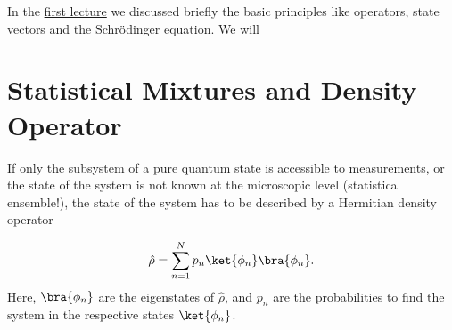 In the \href{https://www.authorea.com/326007/wyOpqBcLPiiNhswBbwDHbA}{first lecture} we discussed briefly the basic principles like operators, state vectors and the Schrödinger equation. We will 

\section{Statistical Mixtures and Density Operator}

If only the subsystem of a pure quantum state is accessible to measurements, or the state of the system is not known at the microscopic level (statistical ensemble!), the state of the system has to be described by a Hermitian density operator

\begin{align}
 \hat{\rho} = \sum_{n=1}^N p_n \ket{\phi_n}\bra{\phi_n}.
\end{align}
Here, $\bra{\phi_n}$ are the eigenstates of $\hat{\rho}$, and $p_n$ are the probabilities to find the system in the respective states $\ket{\phi_n}$.

